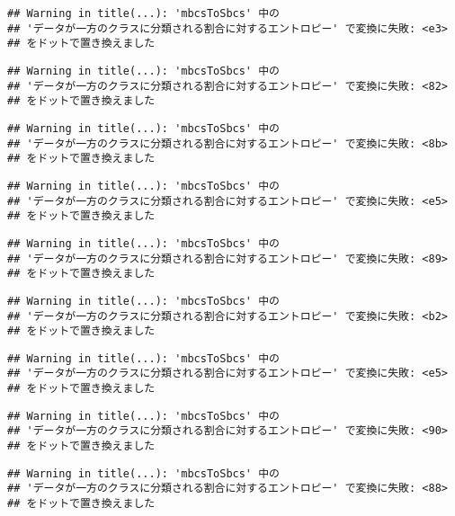 \documentclass[
]{article}
\begin{document}
\begin{verbatim}
## Warning in title(...): 'mbcsToSbcs' 中の
## 'データが一方のクラスに分類される割合に対するエントロピー' で変換に失敗: <e3>
## をドットで置き換えました
\end{verbatim}

\begin{verbatim}
## Warning in title(...): 'mbcsToSbcs' 中の
## 'データが一方のクラスに分類される割合に対するエントロピー' で変換に失敗: <82>
## をドットで置き換えました
\end{verbatim}

\begin{verbatim}
## Warning in title(...): 'mbcsToSbcs' 中の
## 'データが一方のクラスに分類される割合に対するエントロピー' で変換に失敗: <8b>
## をドットで置き換えました
\end{verbatim}

\begin{verbatim}
## Warning in title(...): 'mbcsToSbcs' 中の
## 'データが一方のクラスに分類される割合に対するエントロピー' で変換に失敗: <e5>
## をドットで置き換えました
\end{verbatim}

\begin{verbatim}
## Warning in title(...): 'mbcsToSbcs' 中の
## 'データが一方のクラスに分類される割合に対するエントロピー' で変換に失敗: <89>
## をドットで置き換えました
\end{verbatim}

\begin{verbatim}
## Warning in title(...): 'mbcsToSbcs' 中の
## 'データが一方のクラスに分類される割合に対するエントロピー' で変換に失敗: <b2>
## をドットで置き換えました
\end{verbatim}

\begin{verbatim}
## Warning in title(...): 'mbcsToSbcs' 中の
## 'データが一方のクラスに分類される割合に対するエントロピー' で変換に失敗: <e5>
## をドットで置き換えました
\end{verbatim}

\begin{verbatim}
## Warning in title(...): 'mbcsToSbcs' 中の
## 'データが一方のクラスに分類される割合に対するエントロピー' で変換に失敗: <90>
## をドットで置き換えました
\end{verbatim}

\begin{verbatim}
## Warning in title(...): 'mbcsToSbcs' 中の
## 'データが一方のクラスに分類される割合に対するエントロピー' で変換に失敗: <88>
## をドットで置き換えました
\end{verbatim}
\end{document}
